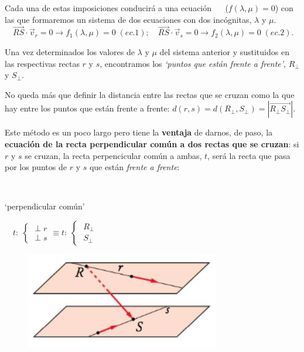 \vspace{2mm}\noindent Cada una de estas imposiciones conducirá a una ecuación \textcolor{gris}{$\quad$ ($f(\lambda,\mu)=0$)} con las que formaremos un sistema de dos ecuaciones con dos incógnitas, $\lambda$ y $\mu$. \textcolor{gris}{$\quad \overrightarrow{RS}\cdot \vec v_r=0\to f_1(\lambda,\mu)=0 \; (ec.1);\quad \overrightarrow{RS}\cdot \vec v_s=0 \to f_2(\lambda,\mu)=0\; (ec.2).$}

\noindent Una vez determinados los valores de $\lambda$ y $\mu$ del sistema anterior y sustituidos en las respectivas rectas $r$ y $s$, encontramos los \textit{`puntos que están frente a frente'}, $R_\bot$ y $S_\bot$.

\noindent No queda más que definir la distancia entre las rectas que se cruzan como la que hay entre los puntos que están frente a frente: $d(r,s)=d(R_\bot,S_\bot)=|\overrightarrow{R_\bot S_\bot}|$.

\noindent Este método es un poco largo pero tiene la \textbf{ventaja} de darnos, de paso, la \textbf{ecuación de la recta perpendicular común a dos rectas que se cruzan}: si $r$ y $s$ se cruzan, la recta perpencicular común a ambas, $t$, será la recta que pasa por los puntos de $r$ y $s$ que están \textit{frente a frente}:

$\quad$ %

\begin{multicols}{2}
\noindent `perpendicular común'

\noindent $\quad t:\; \begin{cases} \; \bot \; r \\ \; \bot \; s \end{cases} \equiv t:\; \begin{cases} \; R_\bot \\ \; S_\bot \end{cases}$

 	\begin{figure}[H]
		\centering
		\includegraphics[width=.5\textwidth]{imagenes/imagenes11/T11IM18.png}
	\end{figure}
\end{multicols}


